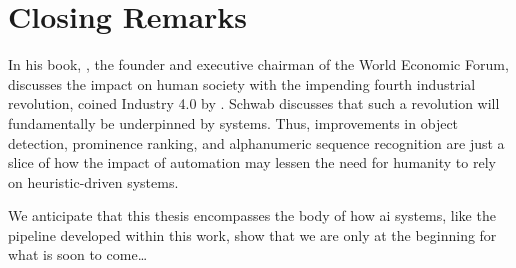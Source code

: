 

\section{Closing Remarks}

In his \citeyear{Schwab:2017vd} book, \citet{Schwab:2017vd}, the founder and executive chairman of the World Economic Forum, discusses the impact on human society with the impending fourth industrial revolution, coined Industry 4.0 by \citet{kagermann2011industrie}. Schwab discusses that such a revolution will fundamentally be underpinned by  systems. Thus, improvements in object detection, prominence ranking, and alphanumeric sequence recognition are just a slice of how the impact of automation may lessen the need for humanity to rely on heuristic-driven systems.

\bigskip
\bigskip
\noindent
We anticipate that this thesis encompasses the body of how \gls{ai} systems, like the pipeline developed within this work, show that we are only at the beginning for what is soon to come\ldots

